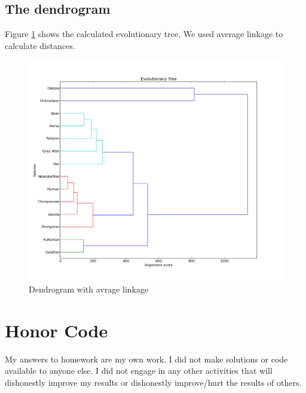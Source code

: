 \documentclass[a4paper,11pt]{article}
\begin{document}
\subsection{The dendrogram}

Figure \ref{dendro} shows the calculated evolutionary tree. We used average linkage to calculate distances. 

\begin{figure}[h!]
\begin{center}
\includegraphics[scale=0.60]{dendro1.png}
\caption{Dendrogram with avrage linkage}
\label{dendro}
\end{center}
\end{figure}

\section*{Honor Code}


My answers to homework are my own work. I did not make solutions or code available to anyone else. I did not engage in any other activities that will dishonestly improve my results or dishonestly improve/hurt the results of others.
\end{document}
